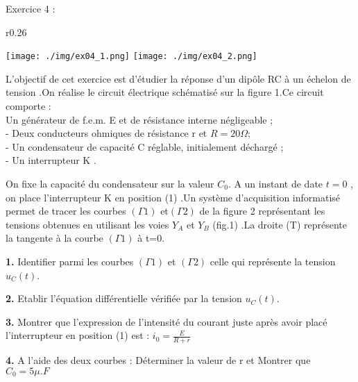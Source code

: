 \documentclass[12pt, french]{article}
\begin{document}
\begin{Box2}{Exercice 4 : }

	\begin{wrapfigure}{r}{0.26\textwidth}
  \begin{center}
	  \vspace{-0.8cm}
	\texttt{[image: ./img/ex04\_1.png]}
	\texttt{[image: ./img/ex04\_2.png]}
	\caption{}
  \end{center}
\end{wrapfigure}




	L’objectif de cet exercice est d’étudier la réponse d’un dipôle RC  à un échelon de tension .On réalise le circuit électrique schématisé sur la figure 1.Ce circuit comporte : 
\\Un générateur de f.e.m. E et de résistance
interne négligeable ;
\\- Deux conducteurs ohmiques de résistance r
et $R=20\Omega$;
\\- Un condensateur de capacité C réglable,
initialement déchargé ;
\\- Un interrupteur K .

On fixe la capacité du condensateur sur la valeur $C_0$. A un instant de date $t=0$ , on place l’interrupteur
K en position (1) .Un système d’acquisition informatisé permet de tracer les courbes $(\Gamma 1)$ et$(\Gamma 2)$ de la
figure 2 représentant les tensions obtenues en utilisant les voies $Y_A$ et $Y_B$
(fig.1) .La droite (T) représente la tangente à la courbe $(\Gamma 1)$ à t=0.

\textbf{1. }Identifier parmi les courbes $(\Gamma 1)$ et $(\Gamma 2)$ celle qui représente la tension $u_C(t)$.

\textbf{2. }Etablir l’équation différentielle vérifiée par la tension $u_C(t)$.

\textbf{3. }Montrer que l’expression de l’intensité du courant juste après avoir placé l’interrupteur en position (1) est : $i_0 = \frac{E}{R+r}$

\textbf{4. }A l’aide des deux courbes : Déterminer la valeur de r et Montrer que $C_0 = 5\mu.F$  

\end{Box2}





\end{document}
